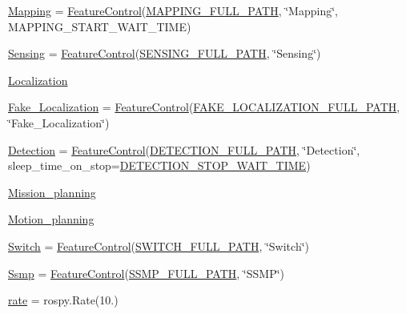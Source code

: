 \begin{DoxyCompactItemize}
\item 
\hyperlink{namespacemanager_af454674dd3d624772b2de2685f10c88c}{Mapping} = \hyperlink{classFeatureControl_1_1FeatureControl}{Feature\+Control}(\hyperlink{namespacemanager_aa62d8709423fedec1c58eb802a65cd4d}{M\+A\+P\+P\+I\+N\+G\+\_\+\+F\+U\+L\+L\+\_\+\+P\+A\+TH}, \char`\"{}Mapping\char`\"{}, M\+A\+P\+P\+I\+N\+G\+\_\+\+S\+T\+A\+R\+T\+\_\+\+W\+A\+I\+T\+\_\+\+T\+I\+ME)
\item 
\hyperlink{namespacemanager_a01fea7b432fe2f29a7e9196f34bd48a3}{Sensing} = \hyperlink{classFeatureControl_1_1FeatureControl}{Feature\+Control}(\hyperlink{namespacemanager_aeedd72a434a67d10fd373ddd152ae332}{S\+E\+N\+S\+I\+N\+G\+\_\+\+F\+U\+L\+L\+\_\+\+P\+A\+TH}, \char`\"{}Sensing\char`\"{})
\item 
\hyperlink{namespacemanager_a03e9f03e0d9497f17cb246b69ff0bd77}{Localization}
\item 
\hyperlink{namespacemanager_ae829d43cf97604b643b27ca5db0060f2}{Fake\+\_\+\+Localization} = \hyperlink{classFeatureControl_1_1FeatureControl}{Feature\+Control}(\hyperlink{namespacemanager_a3f4276e287ba46746f54f0caa40e408d}{F\+A\+K\+E\+\_\+\+L\+O\+C\+A\+L\+I\+Z\+A\+T\+I\+O\+N\+\_\+\+F\+U\+L\+L\+\_\+\+P\+A\+TH}, \char`\"{}Fake\+\_\+\+Localization\char`\"{})
\item 
\hyperlink{namespacemanager_a9fe1a53a39fe1ece9045bed8a2f69092}{Detection} = \hyperlink{classFeatureControl_1_1FeatureControl}{Feature\+Control}(\hyperlink{namespacemanager_a6c770a978c4d514742b18d200aa5e09e}{D\+E\+T\+E\+C\+T\+I\+O\+N\+\_\+\+F\+U\+L\+L\+\_\+\+P\+A\+TH}, \char`\"{}Detection\char`\"{}, sleep\+\_\+time\+\_\+on\+\_\+stop=\hyperlink{namespacemanager_a38f231e60cb3e2fa5c7a738460ddad61}{D\+E\+T\+E\+C\+T\+I\+O\+N\+\_\+\+S\+T\+O\+P\+\_\+\+W\+A\+I\+T\+\_\+\+T\+I\+ME})
\item 
\hyperlink{namespacemanager_a3ca3b4d851b5de341c26d23bdb09d8ee}{Mission\+\_\+planning}
\item 
\hyperlink{namespacemanager_ac2ae4d2bb63e8cf1f3a908e2e72f8405}{Motion\+\_\+planning}
\item 
\hyperlink{namespacemanager_a55e451ff200400a3cbd1e61153e5ed83}{Switch} = \hyperlink{classFeatureControl_1_1FeatureControl}{Feature\+Control}(\hyperlink{namespacemanager_aa8c7bc9defad2d982a87f67d530919bc}{S\+W\+I\+T\+C\+H\+\_\+\+F\+U\+L\+L\+\_\+\+P\+A\+TH}, \char`\"{}Switch\char`\"{})
\item 
\hyperlink{namespacemanager_ab361294ddc773bf76e3a2d514a9649d0}{Ssmp} = \hyperlink{classFeatureControl_1_1FeatureControl}{Feature\+Control}(\hyperlink{namespacemanager_af8b394f3a0664a2eb78bb3c7ec36dd97}{S\+S\+M\+P\+\_\+\+F\+U\+L\+L\+\_\+\+P\+A\+TH}, \char`\"{}S\+S\+MP\char`\"{})
\item 
\hyperlink{namespacemanager_aae333bf686b5b44cf7df44b5ea5c2234}{rate} = rospy.\+Rate(10.)
\end{DoxyCompactItemize}


